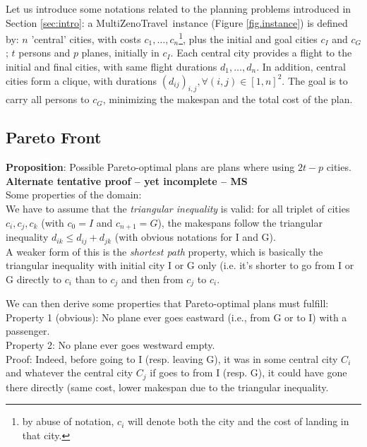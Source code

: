 \documentclass{llncs}
\def\MULTIZENO{{\sc MultiZenoTravel}}
\begin{document}
Let us introduce some notations related to the planning problems introduced in Section \ref{sec:intro}: a \MULTIZENO\ instance (Figure \ref{fig.instance}) is defined by: $n$ 'central' cities, with costs $c_1, \ldots, c_n$\footnote{by abuse of notation, $c_i$ will denote both the city and the cost of landing in that city.}, plus the initial and goal cities $c_I$ and $c_G$; $t$ persons and $p$ planes, initially in $c_I$. Each central city provides a flight to the initial and final cities, with same flight durations $d_1, \ldots, d_n$. In addition, central cities form a clique, with durations $(d_{ij})_{i,j}, \forall (i,j) \in [1,n]^2$. The goal is to carry all persons to $c_G$, minimizing the makespan and the total cost of the plan.


\subsection{Pareto Front}

\noindent
{\bf Proposition}: Possible Pareto-optimal plans are plans where using $2t-p$ cities.\\

{\bf Alternate tentative proof -- yet incomplete -- MS}\\
Some properties of the domain: \\
We have to assume that the {\em triangular inequality} is valid: for all triplet of cities $c_i, c_j, c_k$ (with $c_0=I$ and $c_{n+1}=G$), the makespans follow the triangular inequality $d_{ik} \leq d_{ij} + d_{jk}$ (with obvious notations for I and G).\\
A weaker form of this is the {\em shortest path} property, which is basically the triangular inequality with initial city I or G only (i.e. it's shorter to go from I or G directly to $c_i$ than to $c_j$ and then from $c_j$ to $c_i$.

We can then derive some properties that Pareto-optimal plans must fulfill:\\

Property 1 (obvious): No plane ever goes eastward (i.e., from G or to I) with a passenger.\\

Property 2: No plane ever goes westward empty.\\
Proof: Indeed, before going to I (resp. leaving G), it was in some central city $C_i$ and whatever the central city $C_j$ if goes to from I (resp. G), it could have gone there directly (same cost, lower makespan due to the triangular inequality.\\
\end{document}
